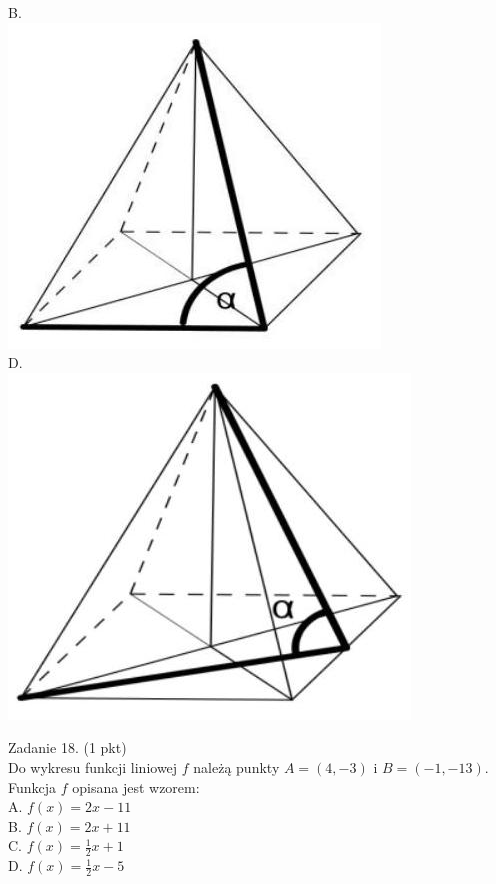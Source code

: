 \documentclass[10pt]{article}
\begin{document}
B.\\
\includegraphics[max width=\textwidth, center]{2024_11_21_9a9f600c3b3af5013d80g-06(1)}\\
D.\\
\includegraphics[max width=\textwidth, center]{2024_11_21_9a9f600c3b3af5013d80g-06(3)}

Zadanie 18. (1 pkt)\\
Do wykresu funkcji liniowej \(f\) należą punkty \(A=(4,-3)\) i \(B=(-1,-13)\). Funkcja \(f\) opisana jest wzorem:\\
A. \(f(x)=2 x-11\)\\
B. \(f(x)=2 x+11\)\\
C. \(f(x)=\frac{1}{2} x+1\)\\
D. \(f(x)=\frac{1}{2} x-5\)
\end{document}
